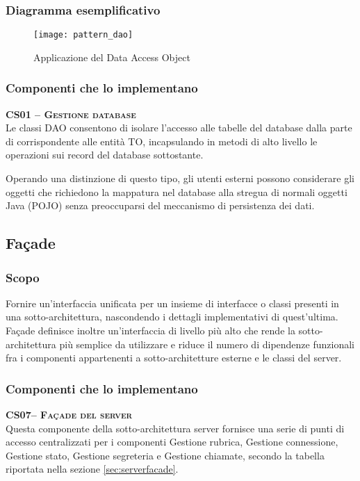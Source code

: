 \subsubsection{Diagramma esemplificativo}
  \begin{figure}[H]
  \centering
  \texttt{[image: pattern\_dao]}
  \caption{Applicazione del  Data Access Object}\label{fig:dao}
\end{figure}

\subsubsection{Componenti che lo implementano}
\begin{description}
\item{\scshape\bfseries CS01 -- Gestione database}\\
Le classi DAO consentono di isolare l'accesso alle tabelle del database dalla parte di  corrispondente alle entità TO, incapsulando in metodi di alto livello le operazioni sui record del database sottostante.

Operando una distinzione di questo tipo, gli utenti esterni possono considerare gli oggetti che richiedono la mappatura nel database alla stregua di normali oggetti Java (POJO) senza preoccuparsi del meccanismo di persistenza dei dati.
\end{description}

\subsection{Façade}

\subsubsection{Scopo}
Fornire un'interfaccia unificata per un insieme di interfacce o classi presenti in una sotto-architettura, nascondendo i dettagli implementativi di quest'ultima. Façade definisce inoltre un'interfaccia di livello più alto che rende la sotto-architettura più semplice da utilizzare e riduce il numero di dipendenze funzionali fra i componenti appartenenti a sotto-architetture esterne e le classi del server.

\subsubsection{Componenti che lo implementano}
\begin{description}
  \item{\scshape\bfseries CS07-- Façade del server}\\
Questa componente della sotto-architettura server fornisce una serie di punti di accesso centralizzati per i componenti \textsf{Gestione rubrica}, \textsf{Gestione connessione}, \textsf{Gestione stato}, \textsf{Gestione segreteria} e \textsf{Gestione chiamate}, secondo la tabella riportata nella sezione \vref{sec:serverfacade}.
\end{description}

